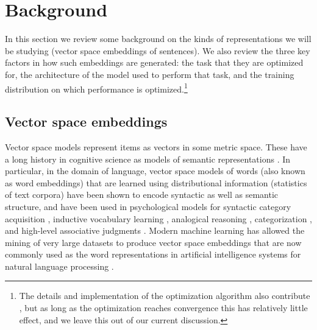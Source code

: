 \section{Background}

In this section we review some background on the kinds of representations we will be studying (vector space embeddings of sentences). We also review the three key factors in how such embeddings are generated: the task that they are optimized for, the architecture of the model used to perform that task, and the training distribution on which performance is optimized.\footnote{The details and implementation of the optimization algorithm also contribute \citep[see][for an overview]{ruder2016overview}, but as long as the optimization reaches convergence this has relatively little effect, and we leave this out of our current discussion.}


\subsection{Vector space embeddings}
Vector space models represent items as vectors in some metric space. These have a long history in cognitive science as models of semantic representations \citep{steyvers2006multidimensional, beals1968foundations, pereira2016comparative}. In particular, in the domain of language, vector space models of words (also known as word embeddings) that are learned using distributional information (statistics of text corpora) have been shown to encode syntactic as well as semantic structure, and have been used in psychological models for syntactic category acquisition \citep{redington1998distributional}, inductive vocabulary learning \citep{landauer1997solution}, analogical reasoning \citep{rumelhart1973model}, categorization \citep{jones2007representing}, and high-level associative judgments \citep{bhatia2017associative}. Modern machine learning has allowed the mining of very large datasets to produce vector space embeddings that are now commonly used as the word representations in artificial intelligence systems for natural language processing \citep{pennington14, mikolov2013distributed}.

